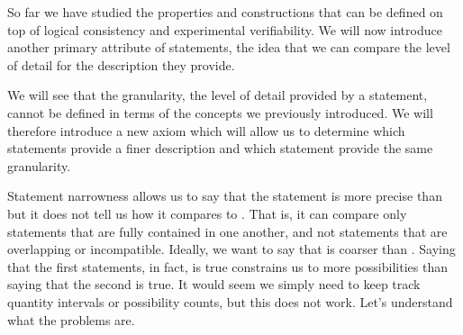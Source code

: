 \documentclass[11pt,letterpaper,fleqn]{memoir} %
\begin{document}
So far we have studied the properties and constructions that can be defined on top of logical consistency and experimental verifiability. We will now  introduce another primary attribute of statements, the idea that we can compare the level of detail for the description they provide.

We will see that the granularity, the level of detail provided by a statement, cannot be defined in terms of the concepts we previously introduced. We will therefore introduce a new axiom which will allow us to determine which statements provide a finer description and which statement provide the same granularity.

Statement narrowness allows us to say that the statement  is more precise than  but it does not tell us how it compares to . That is, it can compare only statements that are fully contained in one another, and not statements that are overlapping or incompatible. Ideally, we want to say that  is coarser than . Saying that the first statements, in fact, is true constrains us to more possibilities than saying that the second is true. It would seem we simply need to keep track quantity intervals or possibility counts, but this does not work. Let's understand what the problems are.
\end{document}
